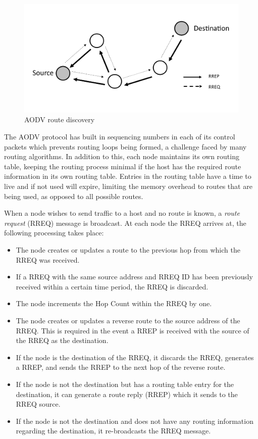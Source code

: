     \FloatBarrier
    \begin{figure}[ht]
      \includegraphics[width=\textwidth]{Images/chapter2/aodv.png}
      \caption{AODV route discovery}
      \label{fig:adov}
    \end{figure}
    \FloatBarrier

    The AODV protocol has built in sequencing numbers in each of its control
    packets which prevents routing loops being formed, a challenge faced by many
    routing algorithms. In addition to this, each node maintains its own routing
    table, keeping the routing process minimal if the host has the required
    route information in its own routing table. Entries in the routing table
    have a time to live and if not used will expire, limiting the memory overhead
    to routes that are being used, as opposed to all possible routes.

    When a node wishes to send traffic to a host and no route is known, a \textit{route
    request} (RREQ) message is broadcast. At each node the RREQ arrives at, the
    following processing takes place:
    \begin{itemize}
      \item The node creates or updates a route to the previous hop from which
      the RREQ was received.
      \item If a RREQ with the same source address and RREQ ID has been previously
      received within a certain time period, the RREQ is discarded.
      \item The node increments the Hop Count within the RREQ by one.
      \item The node creates or updates a reverse route to the source address of
      the RREQ. This is required in the event a RREP is received with the source
      of the RREQ as the destination.
      \item If the node is the destination of the RREQ, it discards the RREQ,
      generates a RREP, and sends the RREP to the next hop of the reverse route.
      \item If the node is not the destination but has a routing table entry
      for the destination, it can generate a  route reply (RREP) which it sends to the RREQ source.
      \item If the node is not the destination and does not have any routing information
      regarding the destination, it re-broadcasts the RREQ message.
    \end{itemize}

